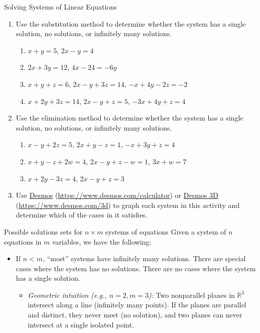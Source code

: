 \documentclass{article}
\begin{document}
\begin{activity}Solving Systems of Linear Equations
    \begin{enumerate}
        \item Use the substitution method to determine whether the system has a single solution, no solutions, or infinitely many solutions.
        \begin{enumerate}[label=(\alph*)]
            \item \(x+y=5\), \(2x-y=4\)
            \item \(2x+3y=12\), \(4x-24=-6y\)
            \item \(x+y+z=6\), \(2x-y+3z=14\), \(-x+4y-2z=-2\)
            \item \(x+2y+3z=14\), \(2x-y+z=5\), \(-3x+4y+z=4\)
        \end{enumerate}
        \item Use the elimination method to determine whether the system has a single solution, no solutions, or infinitely many solutions.
        \begin{enumerate}[label=(\alph*)]
            \item \(x - y + 2z = 5\), \(2x + y - z = 1\), \(-x + 3y + z = 4\)
            \item \(x + y - z + 2w = 4\), \(2x - y + z - w = 1\), \(3x + w = 7\)
            \item \(x + 2y - 3z = 4\), \(2x - y + z = 3\)
        \end{enumerate}
        \item Use \href{https://www.desmos.com/calculator}{Desmos} (\url{https://www.desmos.com/calculator}) or \href{https://www.desmos.com/3d}{Desmos 3D} (\url{https://www.desmos.com/3d}) to graph each system in this activity and determine which of the cases in  it satisfies.
    \end{enumerate}
\begin{calloutbox}{Possible solutions sets for \(n\times m\) systems of equations}\label{box:solution-sets-taxonomy}
    Given a system of \(n\) equations in \(m\) variables, we have the following:
\begin{itemize}
    \item If \(n<m\), ``most'' systems have infinitely many solutions. There are special cases where the system has no solutions. There are no cases where the system has a single solution.
    \begin{itemize}
        \item \emph{Geometric intuition (e.g., \(n=2, m=3\)):} Two nonparallel planes in \(\mathbb{R}^3\) intersect along a line (infinitely many points). If the planes are parallel and distinct, they never meet (no solution), and two planes can never intersect at a single isolated point.

\end{itemize}
\end{itemize}
\end{calloutbox}
\end{activity}
\end{document}
